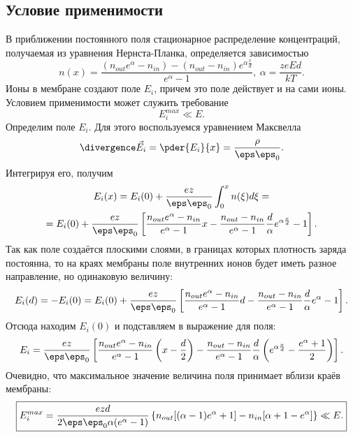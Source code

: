 \documentclass{hedwork}
\begin{document}
\subsection{Условие применимости}
    В приближении постоянного поля стационарное распределение концентраций,
    получаемая из уравнения Нернста-Планка, определяется зависимостью
    \[
        n(x) = \frac{(n_{out}e^\alpha - n_{in}) - (n_{out} -
        n_{in})e^{\alpha\frac{x}{d}}}{e^\alpha - 1},\ \alpha = \frac{zeEd}{kT}.
    \]
    Ионы в мембране создают поле \( E_i \), причем это поле действует и на
    сами ионы. Условием применимости может служить требование
    \[
        E_i^{max} \ll E.
    \]
    Определим поле \( E_i \). Для этого воспользуемся уравнением Максвелла
    \[
        \divergence\vec{E}_i = \pder{E_i}{x} = \frac{\rho}{\eps\eps_0}.
    \]
    Интегрируя его, получим
    \begin{gather}
        E_i(x) = E_i(0) + \frac{ez}{\eps\eps_0}\int_0^x n(\xi)d\xi = \nonumber\\
        = E_i(0) + \frac{ez}{\eps\eps_0}\left[
        \frac{n_{out}e^\alpha - n_{in}}{e^\alpha - 1}x - \frac{n_{out} -
        n_{in}}{e^\alpha - 1}\frac{d}{\alpha}{e^{\alpha\frac{x}{d}} - 1}
        \right].
    \end{gather}
    Так как поле создаётся плоскими слоями, в границах которых плотность заряда
    постоянна, то на краях мембраны поле внутренних ионов будет иметь разное
    направление, но одинаковую величину:
    \begin{equation}
        E_i(d) = -E_i(0) = E_i(0) + \frac{ez}{\eps\eps_0}\left[
        \frac{n_{out}e^\alpha - n_{in}}{e^\alpha - 1}d - \frac{n_{out} -
        n_{in}}{e^\alpha - 1}\frac{d}{\alpha}{e^\alpha - 1}
        \right].
    \end{equation}
    Отсюда находим \( E_i(0) \) и подставляем в выражение для поля:
    \begin{equation}
        E_i = \frac{ez}{\eps\eps_0}\left[
        \frac{n_{out}e^\alpha - n_{in}}{e^\alpha - 1}\left(x-\frac{d}{2}\right)
        - \frac{n_{out} - n_{in}}{e^\alpha - 1}\frac{d}{\alpha}
        \left(e^{\alpha\frac{x}{d}} - \frac{e^\alpha + 1}{2}\right)
        \right].
    \end{equation}
    Очевидно, что максимальное значение величина поля принимает вблизи краёв
    мембраны:
    \begin{equation}
        \boxed{
        E_i^{max} = \frac{ezd}{2\eps\eps_0\alpha(e^\alpha - 1)}\left\{
            n_{out}[(\alpha - 1)e^\alpha + 1] - n_{in}[\alpha + 1 - e^\alpha]
        \right\} \ll E.}
    \end{equation}
\end{document}
